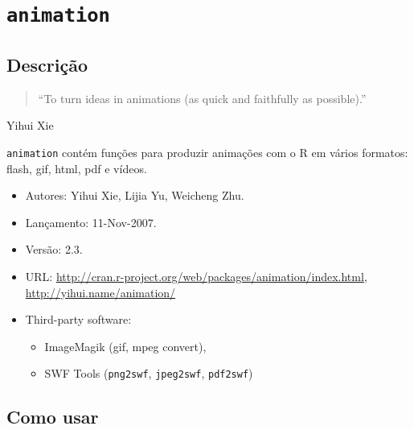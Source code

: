 \section{\texttt{animation}}


\subsection{Descrição}

\begin{frame}

  \begin{quote}
    ``To turn ideas in animations (as quick and faithfully as
    possible).''
  \end{quote}
  \hspace{0.66\linewidth} Yihui Xie \vspace{\baselineskip}

  \texttt{animation} contém funções para produzir animações com o R em
  vários formatos: flash, gif, html, pdf e vídeos.

  \begin{itemize}
  \item Autores: Yihui Xie, Lijia Yu, Weicheng Zhu.
  \item Lançamento: 11-Nov-2007.
  \item Versão: 2.3.
  \item URL:
    \url{http://cran.r-project.org/web/packages/animation/index.html},
    \url{http://yihui.name/animation/}
  \item Third-party software:
    \begin{itemize}
    \item ImageMagik (gif, mpeg convert),
    \item SWF Tools (\texttt{png2swf}, \texttt{jpeg2swf},
      \texttt{pdf2swf})
    \end{itemize}
  \end{itemize}

\end{frame}


\subsection{Como usar}

